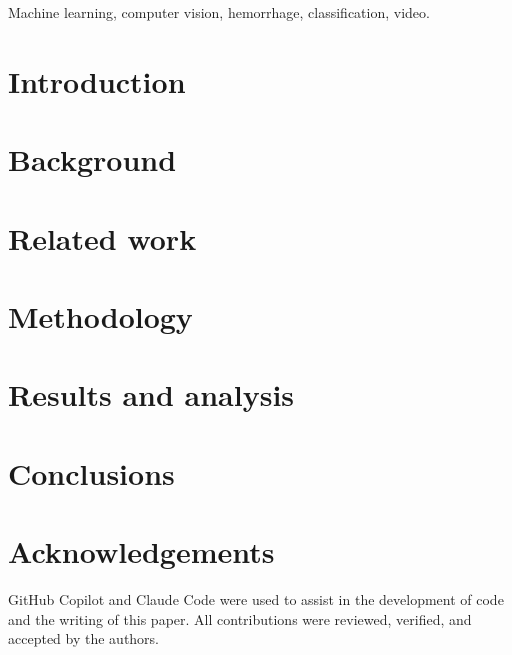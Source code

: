 \documentclass[conference]{IEEEtran}
\begin{document}


\begin{abstract}

\end{abstract}

\begin{IEEEkeywords}
    Machine learning, computer vision, hemorrhage, classification, video.
\end{IEEEkeywords}

\section{Introduction}


\section{Background}


\section{Related work}


\section{Methodology}


\section{Results and analysis}


\section{Conclusions}


\section*{Acknowledgements}
GitHub Copilot and Claude Code were used to assist in the development of code and the writing of this paper. All contributions were reviewed, verified, and accepted by the authors.




% 
\end{document}
